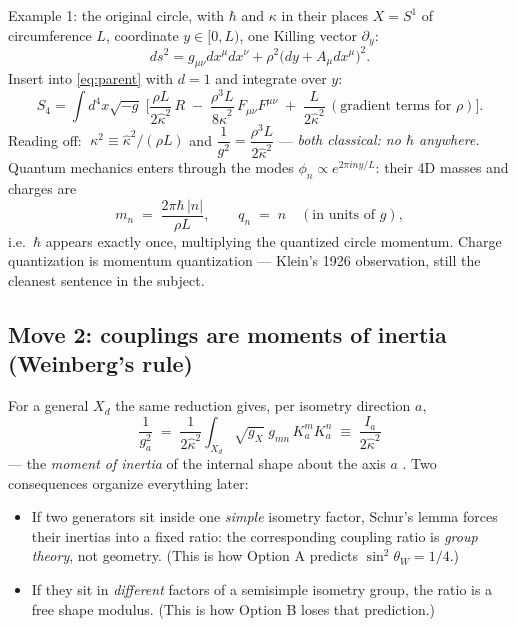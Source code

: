 \documentclass[11pt]{article}
\newcommand{\hb}{\hbar}
\begin{document}
\begin{examplebox}{Example 1: the original circle, with $\hb$ and $\kappa$ in their places}
$X=S^1$ of circumference $L$, coordinate $y\in[0,L)$, one Killing vector $\partial_y$:
\[
ds^2 = g_{\mu\nu}dx^\mu dx^\nu + \rho^2\big(dy + A_\mu dx^\mu\big)^2 .
\]
Insert into \eqref{eq:parent} with $d=1$ and integrate over $y$:
\[
S_4=\int d^4x \sqrt{-g}\;\Big[\frac{\rho L}{2\hat\kappa^2}\,R
\;-\;\frac{\rho^3 L}{8\hat\kappa^2}\,F_{\mu\nu}F^{\mu\nu}
\;+\;\frac{L}{2\hat\kappa^2}\,(\text{gradient terms for }\rho)\Big].
\]
Reading off: $\;\kappa^2 \equiv \hat\kappa^2/(\rho L)$ \;and\;
$\dfrac{1}{g^2} = \dfrac{\rho^3 L}{2\hat\kappa^2}$ ---
\emph{both classical: no $\hb$ anywhere.} Quantum mechanics enters through the modes
$\phi_n \propto e^{2\pi i n y/L}$: their 4D masses and charges are
\[
m_n \;=\; \frac{2\pi \hb\,|n|}{\rho L}, \qquad
q_n \;=\; n \quad(\text{in units of } g),
\]
i.e.\ $\hb$ appears exactly once, multiplying the quantized circle momentum. Charge
quantization is momentum quantization --- Klein's 1926 observation, still the cleanest
sentence in the subject.
\end{examplebox}

\subsection{Move 2: couplings are moments of inertia (Weinberg's rule)}

For a general $X_d$ the same reduction gives, per isometry direction $a$,
\begin{equation}
\boxed{\;\frac{1}{g_a^2} \;=\; \frac{1}{2\hat\kappa^2}\int_{X_d}\!\sqrt{g_X}\;
g_{mn}\,K^m_a K^n_a \;\equiv\; \frac{I_a}{2\hat\kappa^2}\;}
\label{eq:inertia}
\end{equation}
--- the \emph{moment of inertia} of the internal shape about the axis $a$
\cite{Weinberg83}. Two consequences organize everything later:
\begin{itemize}
\item If two generators sit inside one \emph{simple} isometry factor, Schur's lemma forces
their inertias into a fixed ratio: the corresponding coupling ratio is \emph{group theory},
not geometry. (This is how Option A predicts $\sin^2\theta_W = 1/4$.)
\item If they sit in \emph{different} factors of a semisimple isometry group, the ratio is a
free shape modulus. (This is how Option B loses that prediction.)
\end{itemize}
\end{document}
